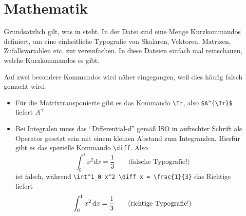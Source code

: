 \section{Mathematik}%
\label{sec:Mathe}
%
Grundsätzlich gilt, was in \parencites{ams1999a}{ams1999b} steht. In der Datei
 sind eine Menge Kurzkommandos definiert, um eine
einheitliche Typografie von Skalaren, Vektoren,
Matrizen, Zufallsvariablen etc.
zur vereinfachen. In diese Dateien einfach mal reinschauen, welche Kurzkommandos
es gibt.

Auf zwei besondere Kommandos wird näher eingegangen, weil dies häufig falsch
gemacht wird.
\begin{itemize}
  \item Für die Matrixtransponierte gibt es das Kommando \verb#\Tr#, also
	\verb#$A^{\Tr}$# liefert $A^{\mathsf{T}}$
	
	\item Bei Integralen muss das \enquote{Differential-d} gemäß
	ISO in aufrechter Schrift als Operator gesetzt sein mit einem kleinen Abstand
	zum Integranden. Hierfür gibt es das spezielle Kommando \verb#\diff#. Also
	\begin{equation}
	 \int^1_0 x^2 d x = \frac{1}{3} \qquad \text{(falsche Typografie!)}
	\end{equation}
	ist falsch, während \verb#\int^1_0 x^2 \diff x = \frac{1}{3}# das Richtige
	liefert
	\begin{equation}
	 \int^1_0 x^2 \mathop{}\!\mathrm{d} x = \frac{1}{3} \qquad \text{(richtige Typografie!)}
	\end{equation}
\end{itemize}
